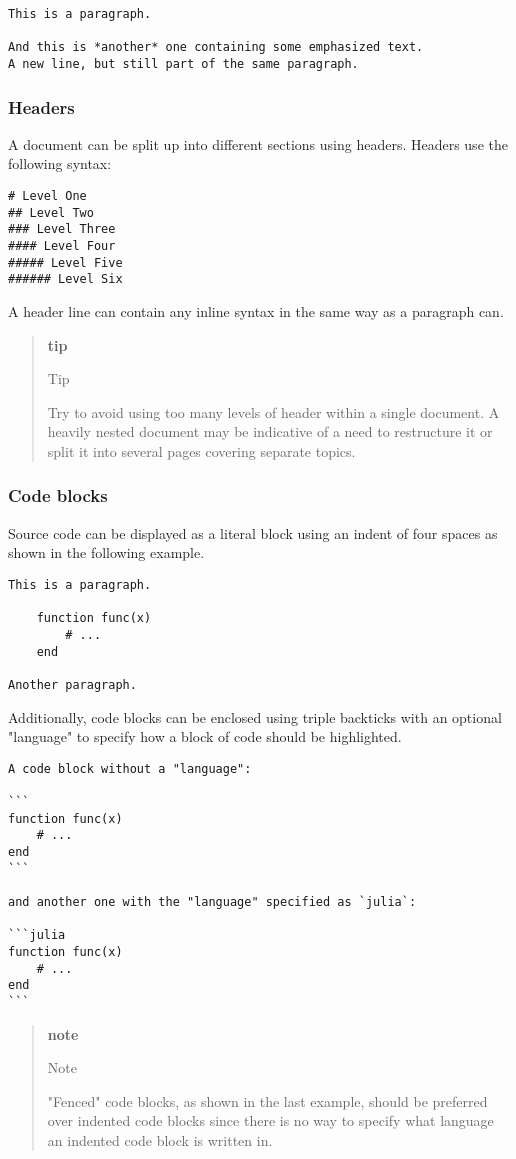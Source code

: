 \begin{verbatim}
This is a paragraph.

And this is *another* one containing some emphasized text.
A new line, but still part of the same paragraph.
\end{verbatim}
\subsubsection{Headers}
A document can be split up into different sections using headers. Headers use the following syntax:

\begin{verbatim}
# Level One
## Level Two
### Level Three
#### Level Four
##### Level Five
###### Level Six
\end{verbatim}
A header line can contain any inline syntax in the same way as a paragraph can.

\begin{quote}
\textbf{tip}

Tip

Try to avoid using too many levels of header within a single document. A heavily nested document may be indicative of a need to restructure it or split it into several pages covering separate topics.

\end{quote}
\subsubsection{Code blocks}
Source code can be displayed as a literal block using an indent of four spaces as shown in the following example.

\begin{verbatim}
This is a paragraph.

    function func(x)
        # ...
    end

Another paragraph.
\end{verbatim}
Additionally, code blocks can be enclosed using triple backticks with an optional "language" to specify how a block of code should be highlighted.

\begin{verbatim}
A code block without a "language":

```
function func(x)
    # ...
end
```

and another one with the "language" specified as `julia`:

```julia
function func(x)
    # ...
end
```
\end{verbatim}
\begin{quote}
\textbf{note}

Note

"Fenced" code blocks, as shown in the last example, should be preferred over indented code blocks since there is no way to specify what language an indented code block is written in.

\end{quote}
